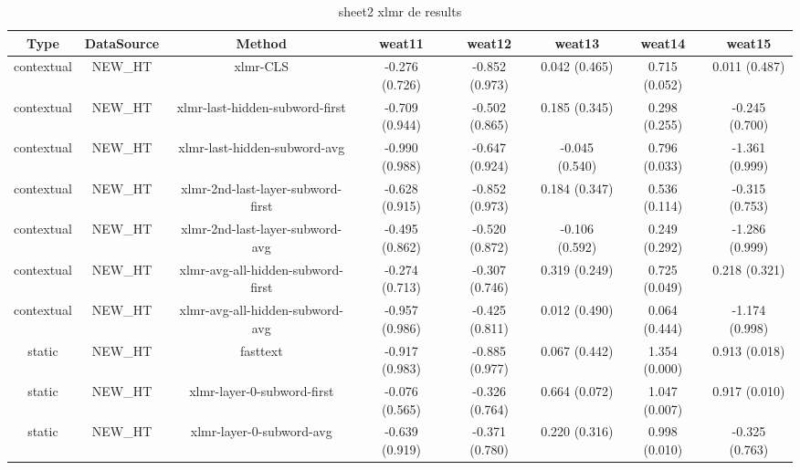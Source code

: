 \begin{sidewaystable}[htb]
    \centering
    \caption{sheet2 xlmr de results}
    \label{appendix_tab:sheet2_xlmr_de_results}
    \small
    \begin{tabular}{@{}cccccccc@{}}
        \toprule
        Type & DataSource & Method & weat11 & weat12 & weat13 & weat14 & weat15 \\
        \midrule
        contextual & NEW\_HT & xlmr-CLS & -0.276 (0.726) & -0.852 (0.973) & 0.042 (0.465) & 0.715 (0.052) & 0.011 (0.487) \\
        contextual & NEW\_HT & xlmr-last-hidden-subword-first & -0.709 (0.944) & -0.502 (0.865) & 0.185 (0.345) & 0.298 (0.255) & -0.245 (0.700) \\
        contextual & NEW\_HT & xlmr-last-hidden-subword-avg & -0.990 (0.988) & -0.647 (0.924) & -0.045 (0.540) & 0.796 (0.033) & -1.361 (0.999) \\
        contextual & NEW\_HT & xlmr-2nd-last-layer-subword-first & -0.628 (0.915) & -0.852 (0.973) & 0.184 (0.347) & 0.536 (0.114) & -0.315 (0.753) \\
        contextual & NEW\_HT & xlmr-2nd-last-layer-subword-avg & -0.495 (0.862) & -0.520 (0.872) & -0.106 (0.592) & 0.249 (0.292) & -1.286 (0.999) \\
        contextual & NEW\_HT & xlmr-avg-all-hidden-subword-first & -0.274 (0.713) & -0.307 (0.746) & 0.319 (0.249) & 0.725 (0.049) & 0.218 (0.321) \\
        contextual & NEW\_HT & xlmr-avg-all-hidden-subword-avg & -0.957 (0.986) & -0.425 (0.811) & 0.012 (0.490) & 0.064 (0.444) & -1.174 (0.998) \\
        static & NEW\_HT & fasttext & -0.917 (0.983) & -0.885 (0.977) & 0.067 (0.442) & 1.354 (0.000) & 0.913 (0.018) \\
        static & NEW\_HT & xlmr-layer-0-subword-first & -0.076 (0.565) & -0.326 (0.764) & 0.664 (0.072) & 1.047 (0.007) & 0.917 (0.010) \\
        static & NEW\_HT & xlmr-layer-0-subword-avg & -0.639 (0.919) & -0.371 (0.780) & 0.220 (0.316) & 0.998 (0.010) & -0.325 (0.763) \\
        \bottomrule
    \end{tabular}
\end{sidewaystable}